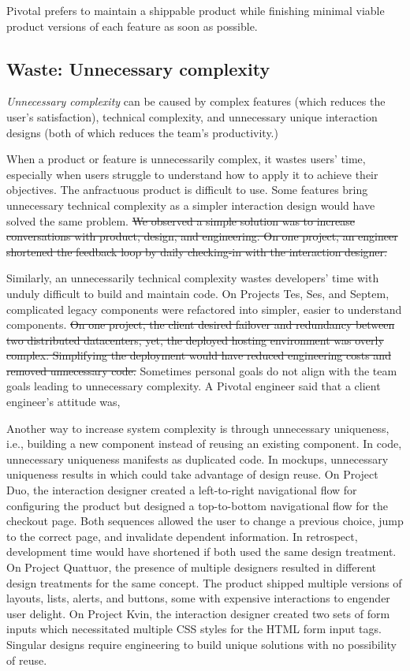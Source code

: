 Pivotal prefers to maintain a shippable product while finishing minimal viable product versions of each feature as soon as possible. 

\subsection{Waste: Unnecessary complexity}
\textit{Unnecessary complexity} can be caused by complex features (which reduces the user's satisfaction), technical complexity, and unnecessary unique interaction designs (both of which reduces the team's productivity.) 

When a product or feature is unnecessarily complex, it wastes users' time, especially when users struggle to understand how to apply it to achieve their objectives. The anfractuous product is difficult to use. Some features bring unnecessary technical complexity as a simpler interaction design would have solved the same problem. \sout{We observed a simple solution was to increase conversations with product, design, and engineering. On one project, an engineer shortened the feedback loop by daily checking-in with the interaction designer.}

Similarly, an unnecessarily technical complexity wastes developers' time with unduly difficult to build and maintain code. On Projects Tes, Ses, and Septem, complicated legacy components were refactored into simpler, easier to understand components. \sout{On one project, the client desired failover and redundancy between two distributed datacenters, yet, the deployed hosting environment was overly complex. Simplifying the deployment would have reduced engineering costs and removed unnecessary code.} Sometimes personal goals do not align with the team goals leading to unnecessary complexity. A Pivotal engineer said that a client engineer's attitude was, 

Another way to increase system complexity is through unnecessary uniqueness, i.e., building a new component instead of reusing an existing component. In code, unnecessary uniqueness manifests as duplicated code. In mockups, unnecessary uniqueness results in  which could take advantage of design reuse. On Project Duo, the interaction designer created a left-to-right navigational flow for configuring the product but designed a top-to-bottom navigational flow for the checkout page. Both sequences allowed the user to change a previous choice, jump to the correct page, and invalidate dependent information. In retrospect, development time would have shortened if both used the same design treatment. On Project Quattuor, the presence of multiple designers resulted in different design treatments for the same concept. The product shipped multiple versions of layouts, lists, alerts, and buttons, some with expensive interactions to engender user delight. On Project Kvin, the interaction designer created two sets of form inputs which necessitated multiple CSS styles for the HTML form input tags. Singular designs require engineering to build unique solutions with no possibility of reuse.   

